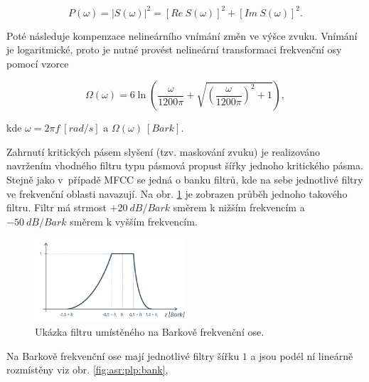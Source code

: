 \begin{equation}
  P\left(\omega\right) = \left| S\left(\omega\right) \right|^{2} = \left[Re\ S\left(\omega\right)\right]^2 + \left[Im\ S\left( \omega \right) \right]^2.
  \label{eq:asr:plp:spectr}
\end{equation}

\noindent Poté následuje kompenzace nelineárního vnímání změn ve výšce zvuku. Vnímání je logaritmické, proto je nutné provést nelineární transformaci frekvenční osy pomocí vzorce

\begin{equation}
  \Omega\left(\omega\right) = 6 \ln \left( \frac{\omega}{1200\pi} + \sqrt{\left(\frac{\omega}{1200\pi}\right)^2 + 1} \right),
  \label{eq:asr:plp:transform}
\end{equation}

\noindent kde $\omega = 2\pi f\ \left[rad/s\right]$ a $\Omega\left(\omega\right)\ \left[Bark\right]$.

Zahrnutí kritických pásem slyšení (tzv. maskování zvuku) je realizováno navržením vhodného filtru typu pásmová propust šířky jednoho kritického pásma. Stejně jako v~případě MFCC se jedná o banku filtrů, kde na sebe jednotlivé filtry ve frekvenční oblasti navazují.
Na obr. \ref{fig:asr:plp:filter} je zobrazen průběh jednoho takového filtru. Filtr má strmost $+20\ dB/Bark$ směrem k nižším frekvencím a $-50\ dB/Bark$ směrem k vyšším frekvencím.

\begin{figure}[hbpt]
  \centering
  \includegraphics[width=0.5\textwidth]{./ch4-asr/img/plp_filter.pdf}
  \caption{Ukázka filtru umístěného na Barkově frekvenční ose.}
  \label{fig:asr:plp:filter}
\end{figure}

\newpage \noindent Na Barkově frekvenční ose mají jednotlivé filtry šířku $1$ a jsou podél ní lineárně rozmístěny viz obr. \ref{fig:asr:plp:bank},

